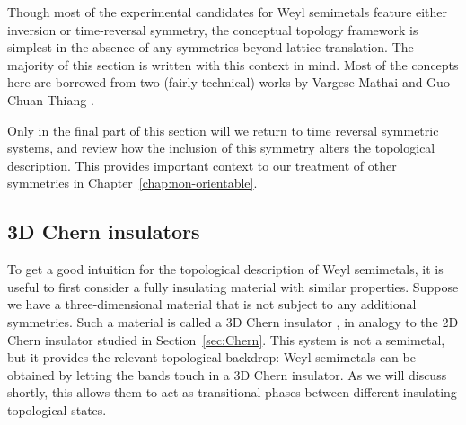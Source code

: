 Though most of the experimental candidates for Weyl semimetals feature either inversion or time-reversal symmetry, the conceptual topology framework is simplest in the absence of any symmetries beyond lattice translation. The majority of this section is written with this context in mind. Most of the concepts here are borrowed from two (fairly technical) works by Vargese Mathai and Guo Chuan Thiang \cite{Mathai_math-review,Mathai_math-paper}.

Only in the final part of this section will we return to time reversal symmetric systems, %
and review how the inclusion of this symmetry alters the topological description. This provides important context to our treatment of other symmetries in Chapter~\ref{chap:non-orientable}.


\subsection{3D Chern insulators}

To get a good intuition for the topological description of Weyl semimetals, it is useful to first consider a fully insulating material with similar properties. Suppose we have a three-dimensional material that is not subject to any additional symmetries. Such a material is called a 3D Chern insulator \cite{Vanderbilt_2018,Liu_photonic-Chern-vector,Devescovi_3D-Chern}, in analogy to the 2D Chern insulator studied in Section~\ref{sec:Chern}. This system is not a semimetal, but it provides the relevant topological backdrop: Weyl semimetals can be obtained by letting the bands touch in a 3D Chern insulator. As we will discuss shortly, this allows them to act as transitional phases between different insulating topological states.

